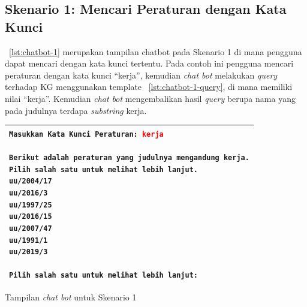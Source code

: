 \subsection{Skenario 1: Mencari Peraturan dengan Kata Kunci}
\label{subsec:skenario-1}

\lst~\ref{lst:chatbot-1} merupakan tampilan chatbot pada Skenario 1 di mana pengguna dapat mencari
\legal dengan kata kunci tertentu. Pada contoh ini pengguna mencari peraturan dengan kata kunci
``kerja'', kemudian \textit{chat bot} melakukan \textit{query} terhadap KG menggunakan template
\lst~\ref{lst:chatbot-1-query}, di mana  memiliki nilai ``kerja''. Kemudian
\textit{chat bot} mengembalikan hasil \textit{query} berupa nama \legal yang pada judulnya terdapa
\textit{substring} kerja.

\begin{listing}[H]
  \begin{center}
    \begin{tabular}{|p{}|}
      \hline
      \makecell[l]{
        \texttt{Masukkan Kata Kunci Peraturan: \textcolor{red}{kerja}}    \\ \\
        \texttt{Berikut adalah peraturan yang judulnya mengandung kerja.} \\
        \texttt{Pilih salah satu untuk melihat lebih lanjut.}             \\
        \texttt{uu/2004/17}                                               \\
        \texttt{uu/2016/3}                                                \\
        \texttt{uu/1997/25}                                               \\
        \texttt{uu/2016/15}                                               \\
        \texttt{uu/2007/47}                                               \\
        \texttt{uu/1991/1}                                                \\
        \texttt{uu/2019/3}                                                \\ \\
        \texttt{Pilih salah satu untuk melihat lebih lanjut: }
      }                                                                   \\
      \hline
    \end{tabular}
  \end{center}
  \caption{Tampilan \textit{chat bot} untuk Skenario 1}
  \label{lst:chatbot-1}
\end{listing}

